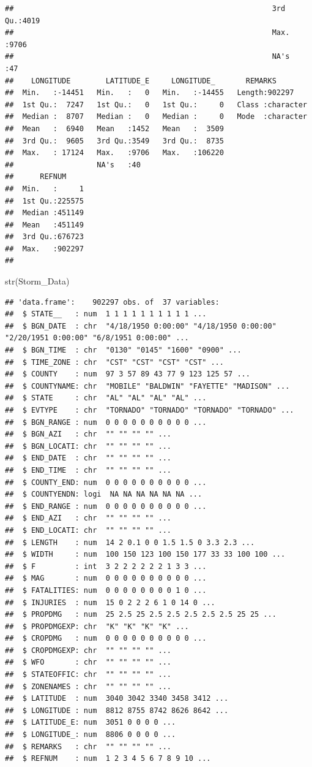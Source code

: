 \documentclass[
]{article}
\newenvironment{Shaded}{\begin{snugshade}}{\end{snugshade}}
\newcommand{\FunctionTok}[1]{\textcolor[rgb]{0.00,0.00,0.00}{#1}}
\newcommand{\NormalTok}[1]{#1}
\begin{document}
\begin{verbatim}
##                                                           3rd Qu.:4019  
##                                                           Max.   :9706  
##                                                           NA's   :47    
##    LONGITUDE        LATITUDE_E     LONGITUDE_       REMARKS         
##  Min.   :-14451   Min.   :   0   Min.   :-14455   Length:902297     
##  1st Qu.:  7247   1st Qu.:   0   1st Qu.:     0   Class :character  
##  Median :  8707   Median :   0   Median :     0   Mode  :character  
##  Mean   :  6940   Mean   :1452   Mean   :  3509                     
##  3rd Qu.:  9605   3rd Qu.:3549   3rd Qu.:  8735                     
##  Max.   : 17124   Max.   :9706   Max.   :106220                     
##                   NA's   :40                                        
##      REFNUM      
##  Min.   :     1  
##  1st Qu.:225575  
##  Median :451149  
##  Mean   :451149  
##  3rd Qu.:676723  
##  Max.   :902297  
## 
\end{verbatim}

\begin{Shaded}
\begin{Highlighting}[]
\FunctionTok{str}\NormalTok{(Storm\_Data)}
\end{Highlighting}
\end{Shaded}

\begin{verbatim}
## 'data.frame':    902297 obs. of  37 variables:
##  $ STATE__   : num  1 1 1 1 1 1 1 1 1 1 ...
##  $ BGN_DATE  : chr  "4/18/1950 0:00:00" "4/18/1950 0:00:00" "2/20/1951 0:00:00" "6/8/1951 0:00:00" ...
##  $ BGN_TIME  : chr  "0130" "0145" "1600" "0900" ...
##  $ TIME_ZONE : chr  "CST" "CST" "CST" "CST" ...
##  $ COUNTY    : num  97 3 57 89 43 77 9 123 125 57 ...
##  $ COUNTYNAME: chr  "MOBILE" "BALDWIN" "FAYETTE" "MADISON" ...
##  $ STATE     : chr  "AL" "AL" "AL" "AL" ...
##  $ EVTYPE    : chr  "TORNADO" "TORNADO" "TORNADO" "TORNADO" ...
##  $ BGN_RANGE : num  0 0 0 0 0 0 0 0 0 0 ...
##  $ BGN_AZI   : chr  "" "" "" "" ...
##  $ BGN_LOCATI: chr  "" "" "" "" ...
##  $ END_DATE  : chr  "" "" "" "" ...
##  $ END_TIME  : chr  "" "" "" "" ...
##  $ COUNTY_END: num  0 0 0 0 0 0 0 0 0 0 ...
##  $ COUNTYENDN: logi  NA NA NA NA NA NA ...
##  $ END_RANGE : num  0 0 0 0 0 0 0 0 0 0 ...
##  $ END_AZI   : chr  "" "" "" "" ...
##  $ END_LOCATI: chr  "" "" "" "" ...
##  $ LENGTH    : num  14 2 0.1 0 0 1.5 1.5 0 3.3 2.3 ...
##  $ WIDTH     : num  100 150 123 100 150 177 33 33 100 100 ...
##  $ F         : int  3 2 2 2 2 2 2 1 3 3 ...
##  $ MAG       : num  0 0 0 0 0 0 0 0 0 0 ...
##  $ FATALITIES: num  0 0 0 0 0 0 0 0 1 0 ...
##  $ INJURIES  : num  15 0 2 2 2 6 1 0 14 0 ...
##  $ PROPDMG   : num  25 2.5 25 2.5 2.5 2.5 2.5 2.5 25 25 ...
##  $ PROPDMGEXP: chr  "K" "K" "K" "K" ...
##  $ CROPDMG   : num  0 0 0 0 0 0 0 0 0 0 ...
##  $ CROPDMGEXP: chr  "" "" "" "" ...
##  $ WFO       : chr  "" "" "" "" ...
##  $ STATEOFFIC: chr  "" "" "" "" ...
##  $ ZONENAMES : chr  "" "" "" "" ...
##  $ LATITUDE  : num  3040 3042 3340 3458 3412 ...
##  $ LONGITUDE : num  8812 8755 8742 8626 8642 ...
##  $ LATITUDE_E: num  3051 0 0 0 0 ...
##  $ LONGITUDE_: num  8806 0 0 0 0 ...
##  $ REMARKS   : chr  "" "" "" "" ...
##  $ REFNUM    : num  1 2 3 4 5 6 7 8 9 10 ...
\end{verbatim}
\end{document}

